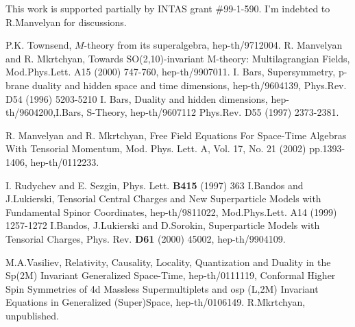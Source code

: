 \documentclass[a4paper,12pt]{article}
\begin{document}
This work is supported partially by INTAS grant \#99-1-590. I'm
indebted to R.Manvelyan for discussions.

\begin{thebibliography}{9}

 P.K. Townsend, $M$-theory from its superalgebra,
hep-th/9712004.
  R. Manvelyan and R. Mkrtchyan, Towards SO(2,10)-invariant
M-theory: Multilagrangian Fields,  Mod.Phys.Lett. A15 (2000)
747-760, hep-th/9907011.
 I. Bars, Supersymmetry, p-brane duality and hidden space
and time dimensions, hep-th/9604139, Phys.Rev. D54 (1996)
5203-5210 \newline I. Bars, Duality and hidden dimensions,
hep-th/9604200,\newline I.Bars, S-Theory, hep-th/9607112 Phys.Rev.
D55 (1997) 2373-2381.

  R. Manvelyan and R. Mkrtchyan, Free Field Equations For Space-Time Algebras With Tensorial
Momentum, Mod. Phys. Lett. A, Vol. 17, No. 21 (2002) pp.1393-1406,
hep-th/0112233.

 I. Rudychev and E. Sezgin, Phys. Lett. \textbf{B415} (1997) 363
 I.Bandos  and J.Lukierski, Tensorial Central Charges and New Superparticle
Models with Fundamental Spinor Coordinates, hep-th/9811022,
Mod.Phys.Lett. A14 (1999) 1257-1272 \newline I.Bandos, J.Lukierski
and D.Sorokin, Superparticle Models with Tensorial Charges, Phys.
Rev. \textbf{D61} (2000) 45002, hep-th/9904109.


 M.A.Vasiliev, Relativity, Causality, Locality,
Quantization and Duality in the Sp(2M) Invariant Generalized
Space-Time, hep-th/0111119, Conformal Higher Spin Symmetries of 4d
Massless Supermultiplets and osp (L,2M) Invariant Equations in
Generalized (Super)Space, hep-th/0106149.
 R.Mkrtchyan, unpublished.

\end{thebibliography}
\end{document}
